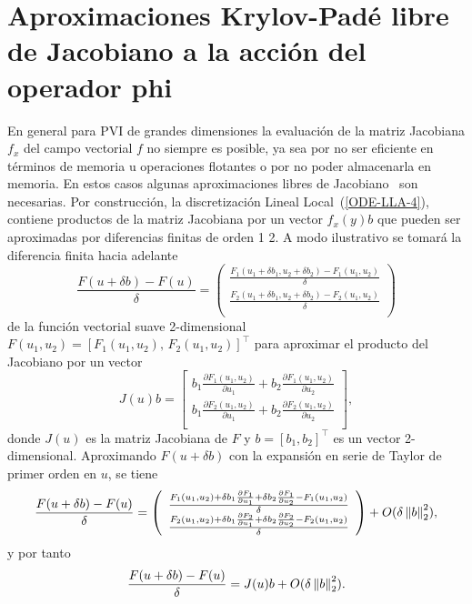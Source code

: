 \section{Aproximaciones Krylov-Padé libre de Jacobiano a la acción del operador phi} \label{section:fj-krylov-pade-approx}
En general para PVI de grandes dimensiones la evaluación de la matriz Jacobiana $f_x$ del campo vectorial $f$ no siempre es posible, ya sea por no ser eficiente en términos de memoria u operaciones flotantes o por no poder almacenarla en memoria. En estos casos algunas aproximaciones libres de Jacobiano~\cite{al2009complex,knoll2004jacobian} son necesarias. Por construcción, la discretización Lineal Local~(\ref{ODE-LLA-4}), contiene productos de la matriz Jacobiana por un vector $f_x(y)b$ que pueden ser aproximadas por diferencias finitas de orden 1  2. A modo ilustrativo se tomará la diferencia finita hacia adelante
\begin{equation*}
	\frac{F(u+\delta b)-F(u)}{\delta} =  \left(\begin{array}{c}
		\frac{F_1(u_1+\delta b_1,u_2+\delta b_2)-F_1(u_1,u_2)}{\delta}\\
		\frac{F_2(u_1+\delta b_1,u_2+\delta b_2)-F_2(u_1,u_2)}{\delta}\\
	\end{array}\right)
\end{equation*}
de la función vectorial suave 2-dimensional $F(u_1,u_2)=[F_1(u_1,u_2),\,F_2(u_1,u_2)]^{\intercal}$ para aproximar el producto del Jacobiano por un vector \begin{equation*}
	J(u)b = \left[\begin{array}{c}
		b_1\frac{\partial F_1(u_1,u_2)}{\partial u_1} + b_2\frac{\partial F_1(u_1,u_2)}{\partial u_2}\\
		b_1\frac{\partial F_2(u_1,u_2)}{\partial u_1} + b_2\frac{\partial F_2(u_1,u_2)}{\partial u_2}\\
	\end{array}\right],
\end{equation*}
donde $J(u)$ es la matriz Jacobiana de $F$ y $b=[b_1,b_2]^{\intercal}$ es un vector 2-dimensional. Aproximando $F(u+\delta b)$ con la expansión en serie de Taylor de primer orden en $u$, se tiene
\begin{equation*}
	\frac{F(u+\delta b)-F(u)}{\delta} =  \left(\begin{array}{c}
		\frac{F_1(u_1,u_2) + \delta b_1 \frac{\partial F_1}{\partial u_1} + \delta b_2 \frac{\partial F_1}{\partial u_2} -F_1(u_1,u_2)}{\delta}\\
		\frac{F_2(u_1,u_2) + \delta b_1 \frac{\partial F_2}{\partial u_1} + \delta b_2 \frac{\partial F_2}{\partial u_2} -F_2(u_1,u_2)}{\delta}\\
	\end{array}\right)  + O(\delta\left\lVert b \right\rVert_2^2),
\end{equation*}
y por tanto
\begin{equation*}
	\frac{F(u+\delta b)-F(u)}{\delta} =  J(u)b + O(\delta\left\lVert b \right\rVert_2^2).
\end{equation*}

